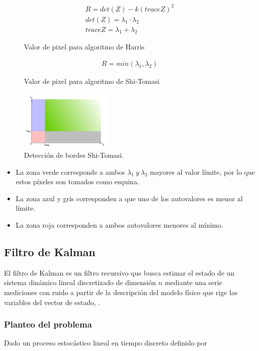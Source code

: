 \begin{figure}[H]
\begin{align}
R= det(Z) - k (trace Z )^2 \\
det(Z)= \lambda_1 \cdot \lambda_2 \\
trace Z = \lambda_1 + \lambda_2
\end{align}
\label{eq:harris}
\caption{Valor de pixel para algoritmo de Harris}
\end{figure}

\begin{figure}[H]
\begin{align}
R= min(\lambda_1 , \lambda_2)
\end{align}
\label{eq:shitom}
\caption{Valor de pixel para algoritmo de Shi-Tomasi}
\end{figure}

\begin{figure}[H]
\centering
	\includegraphics[width=0.4\textwidth]{Imagenes/shitom.png}
	\caption{Detección de bordes Shi-Tomasi.}
	\label{fig:shitom}

\end{figure}
\begin{itemize}
\item La zona verde corresponde a ambos $\lambda_1 \ y \ \lambda_2 $ mayores al valor límite, por lo que estos píxeles son tomados como esquina.
\item La zona azul y gris corresponden a que uno de los autovalores es menor al límite.
\item La zona roja corresponden a ambos autovalores menores al mínimo.
\end{itemize}
\subsection{Filtro de Kalman}
El filtro de Kalman es un filtro recursivo que busca estimar el estado de un sistema dinámico lineal discretizado de dimensión $n$ mediante una serie mediciones con ruido a partir de la descripción del modelo físico que rige las variables del vector de estado\cite{ref:kalman1}, \cite{ref:kalman2}.

\subsubsection{Planteo del problema}
Dado un proceso estocástico lineal en tiempo discreto definido por

